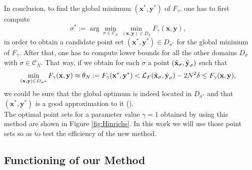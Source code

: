 In conclusion, to find the global minimum $(\textbf{x}^*,\textbf{y}^*)$ of $F_{\gamma}$, one has to first compute
\begin{equation*}
    \sigma^* := \arg\min_{\sigma \in \mathcal{C}_N}{\min_{(\textbf{x},\textbf{y})\in D_{\sigma}}{F_{\gamma}(\textbf{x},\textbf{y})}},
\end{equation*}
in order to obtain a candidate point set $(\textbf{x}^*,\textbf{y}^*)\in D_{\sigma^*}$ for the global minimum of $F_{\gamma}$. After that, one has to compute lower bounds for all the other domains $D_{\sigma}$ with $\sigma\in \mathcal{C}_N$. That way, if we obtain for each $\sigma$ a point $(\Tilde{\textbf{x}}_{\sigma},\Tilde{\textbf{y}}_{\sigma})$ such that
\begin{equation*}
    \min_{(\textbf{x},\textbf{y})\in D_{\sigma^*}}{F_{\gamma}(\textbf{x},\textbf{y})} \approx \theta_N := F_{\gamma}(\textbf{x}^*,\textbf{y}^*) < \mathcal{L}_F(\Tilde{\textbf{x}}_{\sigma},\Tilde{\textbf{y}}_{\sigma}) - 2N^2\delta \leq F_{\gamma}(\textbf{x},\textbf{y}),
\end{equation*}
we could be sure that the global optimum is indeed located in $D_{\sigma^*}$ and that $(\textbf{x}^*,\textbf{y}^*)$ is a good approximation to it (\cite{Hinrichs.pdf}).\\


The optimal point sets for a parameter value $\gamma=1$ obtained by \cite{Hinrichs.pdf} using this method are shown in Figure \ref{fig:Hinrichs}. In this work we will use those point sets so as to test the efficiency of the new method.\\


%
%
%
%
%
%
%
%
%
%
%
%
%
%
%
%
%
%
%
%
%
%
%
%
%
%
%
%
%
%
%
%






\subsection{Functioning of our Method}

